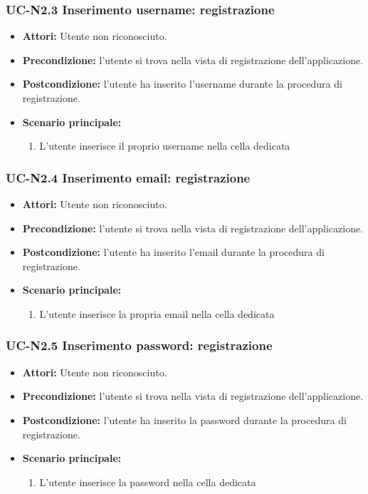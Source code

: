 \subsubsection{UC-N2.3 Inserimento username: registrazione}
\begin{itemize}
	\item \textbf{Attori: }Utente non riconosciuto.
	\item \textbf{Precondizione: }l'utente si trova nella vista 		di registrazione dell'applicazione.
	\item \textbf{Postcondizione: }l'utente ha inserito l'username durante la procedura di registrazione.
	\item \textbf{Scenario principale: }
	\begin{enumerate}
		\item L'utente inserisce il proprio username nella cella dedicata
	\end{enumerate}
\end{itemize}

\subsubsection{UC-N2.4 Inserimento email: registrazione}
\begin{itemize}
	\item \textbf{Attori: }Utente non riconosciuto.
	\item \textbf{Precondizione: }l'utente si trova nella vista 		di registrazione dell'applicazione.
	\item \textbf{Postcondizione: }l'utente ha inserito l'email durante la procedura di registrazione.
	\item \textbf{Scenario principale: }
	\begin{enumerate}
		\item L'utente inserisce la propria email nella cella dedicata
	\end{enumerate}
\end{itemize}

\subsubsection{UC-N2.5 Inserimento password: registrazione}
\begin{itemize}
	\item \textbf{Attori: }Utente non riconosciuto.
	\item \textbf{Precondizione: }l'utente si trova nella vista di registrazione dell'applicazione.
	\item \textbf{Postcondizione: }l'utente ha inserito la password durante la procedura di registrazione.
	\item \textbf{Scenario principale: }
	\begin{enumerate}
		\item L'utente inserisce la password nella cella dedicata
	\end{enumerate}
\end{itemize}

